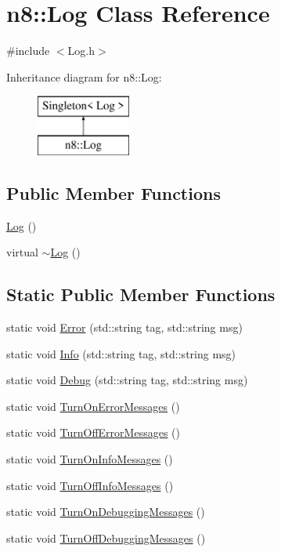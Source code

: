 \hypertarget{classn8_1_1_log}{\section{n8\-:\-:Log Class Reference}
\label{classn8_1_1_log}
}


{\ttfamily \#include $<$Log.\-h$>$}

Inheritance diagram for n8\-:\-:Log\-:\begin{figure}[H]
\begin{center}
\leavevmode
\includegraphics[height=2.000000cm]{classn8_1_1_log}
\end{center}
\end{figure}
\subsection*{Public Member Functions}
\begin{DoxyCompactItemize}
\item 
\hyperlink{classn8_1_1_log_adf2aa71acae5a706ec4e62506e851bb5}{Log} ()
\item 
virtual \hyperlink{classn8_1_1_log_aa29b98fa3440f61ef636a79c23193cb3}{$\sim$\-Log} ()
\end{DoxyCompactItemize}
\subsection*{Static Public Member Functions}
\begin{DoxyCompactItemize}
\item 
static void \hyperlink{classn8_1_1_log_aaa8658e983713fcf8a4aab1fb76c31e3}{Error} (std\-::string tag, std\-::string msg)
\item 
static void \hyperlink{classn8_1_1_log_a97be57e8b2c04da6f47f1e699c827024}{Info} (std\-::string tag, std\-::string msg)
\item 
static void \hyperlink{classn8_1_1_log_ac7e56dd29823f4f0fc2b3a884f575737}{Debug} (std\-::string tag, std\-::string msg)
\item 
static void \hyperlink{classn8_1_1_log_a816be7956f40290b2f4e1b9eeb60b93b}{Turn\-On\-Error\-Messages} ()
\item 
static void \hyperlink{classn8_1_1_log_ad75994d1eca6ff1f1efb4358f62ae88c}{Turn\-Off\-Error\-Messages} ()
\item 
static void \hyperlink{classn8_1_1_log_a47119603ba767c51e547cfbae28d0c97}{Turn\-On\-Info\-Messages} ()
\item 
static void \hyperlink{classn8_1_1_log_a1c455a4fa66ea6148897dabe97cf6352}{Turn\-Off\-Info\-Messages} ()
\item 
static void \hyperlink{classn8_1_1_log_a4e636f7659828b0c16add87aeec9bb6a}{Turn\-On\-Debugging\-Messages} ()
\item 
static void \hyperlink{classn8_1_1_log_ae47bf8c5ff5f6e94433c4741be939dab}{Turn\-Off\-Debugging\-Messages} ()
\end{DoxyCompactItemize}
